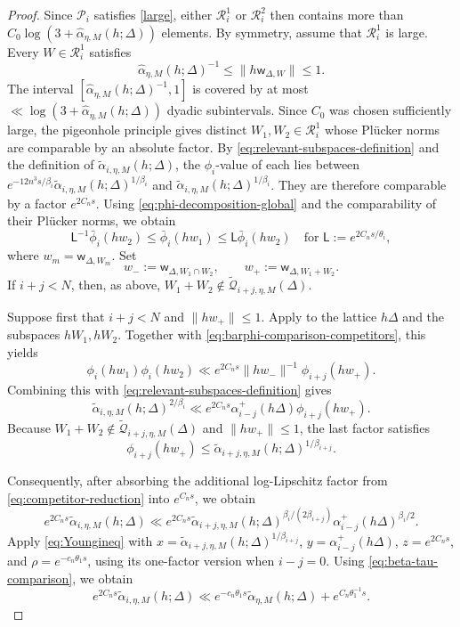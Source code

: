 \documentclass[reqno,11pt]{amsart}
\numberwithin{equation}{section}
\theoremstyle{definition}
\theoremstyle{remark}
\begin{document}
\begin{proof}
Since $\mathcal P_i$ satisfies \eqref{large}, either
$\mathcal R_i^1$ or $\mathcal R_i^2$ then contains more than
$C_0\log(3+\widehat{\alpha}_{\eta,M}(h;\Delta))$ elements. By symmetry, assume that
$\mathcal R_i^1$ is large. Every
$W\in\mathcal R_i^1$ satisfies
$$
\widehat{\alpha}_{\eta,M}(h;\Delta)^{-1}
\le\|h\mathsf w_{\Delta,W}\|\le1.
$$
The interval
$[\widehat{\alpha}_{\eta,M}(h;\Delta)^{-1},1]$ is covered by at most
$\ll \log(3+\widehat{\alpha}_{\eta,M}(h;\Delta))$ dyadic
subintervals. Since $C_0$ was chosen sufficiently
large, the pigeonhole principle gives distinct
$W_1,W_2\in\mathcal R_i^1$ whose Pl\"ucker norms are comparable by an
absolute factor. By \eqref{eq:relevant-subspaces-definition} and the
definition of $\widetilde\alpha_{i,\eta,M}(h;\Delta)$, the
$\phi_i$-value of each lies between
$e^{-12n^3s/\beta_i}\widetilde\alpha_{i,\eta,M}(h;\Delta)^{1/\beta_i}$ and
$\widetilde\alpha_{i,\eta,M}(h;\Delta)^{1/\beta_i}$. They are therefore comparable by a factor
$e^{2C_ns}$. Using \eqref{eq:phi-decomposition-global} and the comparability
of their Pl\"ucker norms, we obtain
\begin{equation}\label{eq:barphi-comparison-competitors}
\mathsf L^{-1}\bar\phi_i(hw_2)
\le\bar\phi_i(hw_1)
\le\mathsf L\bar\phi_i(hw_2) \quad\text{for }\mathsf L:= e^{2C_ns/\theta_i},
\end{equation}
 where $w_m=\mathsf w_{\Delta,W_m}$. Set
$$
w_-:=\mathsf w_{\Delta,W_1\cap W_2},
\qquad
w_+:=\mathsf w_{\Delta,W_1+W_2}.
$$
If $i+j<N$, then, as above,
$W_1+W_2\notin\widetilde{\mathscr Q}_{i+j,\eta,M}(\Delta)$.

 Suppose first that $i+j<N$ and $\|hw_+\|\le1$.  Apply
 to the lattice $h\Delta$ and the subspaces
$hW_1,hW_2$. Together with
\eqref{eq:barphi-comparison-competitors}, this yields
$$
\phi_i(hw_1)\phi_i(hw_2)
\ll e^{2C_ns}
\|hw_-\|^{-1}\phi_{i+j}(hw_+).
$$
Combining this with \eqref{eq:relevant-subspaces-definition} gives
$$
\widetilde\alpha_{i,\eta,M}(h;\Delta)^{2/\beta_i}
\ll
e^{2C_ns}
\alpha_{i-j}^+(h\Delta)
\phi_{i+j}(hw_+).
$$
Because $W_1+W_2\notin\widetilde{\mathscr Q}_{i+j,\eta,M}(\Delta)$ and
$\|hw_+\|\le1$, the last factor satisfies
$$
\phi_{i+j}(hw_+)
\le
\widetilde\alpha_{i+j,\eta,M}(h;\Delta)^{1/\beta_{i+j}}.
$$

Consequently, after absorbing the additional log-Lipschitz factor from
\eqref{eq:competitor-reduction} into $e^{C_ns}$, we obtain
$$
e^{2C_ns}\widetilde\alpha_{i,\eta,M}(h;\Delta)\ll e^{2C_ns}
\widetilde\alpha_{i+j,\eta,M}(h;\Delta)^{\beta_i/(2\beta_{i+j})}
\alpha_{i-j}^+(h\Delta)^{\beta_i/2}.
$$
Apply \eqref{eq:Youngineq} with
$x=\widetilde\alpha_{i+j,\eta,M}(h;\Delta)^{1/\beta_{i+j}}$,
$y=\alpha_{i-j}^+(h\Delta)$, $z=e^{2C_ns}$, and
$\rho=e^{-c_n\theta_1s}$, using its one-factor version when $i-j=0$.
Using
\eqref{eq:beta-tau-comparison}, we obtain
\begin{equation}\label{eq:R1-Mother-contraction}
e^{2C_ns}\widetilde\alpha_{i,\eta,M}(h;\Delta)
\ll e^{-c_n\theta_1 s}\widetilde\alpha_{\eta,M}(h;\Delta)
+e^{C_n\theta_1^{-1}s}.
\end{equation}


\end{proof}
\end{document}
